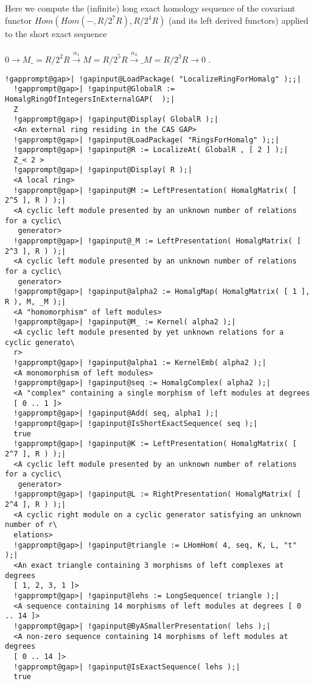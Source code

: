 \documentclass[a4paper,11pt]{report}
\begin{document}
{{ Here we compute the (infinite) long exact homology sequence of the covariant
functor $Hom(Hom(-,R/2^7R),R/2^4R)$ (and its left derived functors) applied to the short exact sequence\\
\\
 $0 \longrightarrow M\_=R/2^2R \stackrel{\alpha_1}{\longrightarrow} M=R/2^5R
\stackrel{\alpha_2}{\longrightarrow} \_M=R/2^3R \longrightarrow 0$ . 
\begin{Verbatim}[commandchars=!@|,fontsize=\small,frame=single,label=Example]
  !gapprompt@gap>| !gapinput@LoadPackage( "LocalizeRingForHomalg" );;|
  !gapprompt@gap>| !gapinput@GlobalR := HomalgRingOfIntegersInExternalGAP(  );|
  Z
  !gapprompt@gap>| !gapinput@Display( GlobalR );|
  <An external ring residing in the CAS GAP>
  !gapprompt@gap>| !gapinput@LoadPackage( "RingsForHomalg" );;|
  !gapprompt@gap>| !gapinput@R := LocalizeAt( GlobalR , [ 2 ] );|
  Z_< 2 >
  !gapprompt@gap>| !gapinput@Display( R );|
  <A local ring>
  !gapprompt@gap>| !gapinput@M := LeftPresentation( HomalgMatrix( [ 2^5 ], R ) );|
  <A cyclic left module presented by an unknown number of relations for a cyclic\
   generator>
  !gapprompt@gap>| !gapinput@_M := LeftPresentation( HomalgMatrix( [ 2^3 ], R ) );|
  <A cyclic left module presented by an unknown number of relations for a cyclic\
   generator>
  !gapprompt@gap>| !gapinput@alpha2 := HomalgMap( HomalgMatrix( [ 1 ], R ), M, _M );|
  <A "homomorphism" of left modules>
  !gapprompt@gap>| !gapinput@M_ := Kernel( alpha2 );|
  <A cyclic left module presented by yet unknown relations for a cyclic generato\
  r>
  !gapprompt@gap>| !gapinput@alpha1 := KernelEmb( alpha2 );|
  <A monomorphism of left modules>
  !gapprompt@gap>| !gapinput@seq := HomalgComplex( alpha2 );|
  <A "complex" containing a single morphism of left modules at degrees
  [ 0 .. 1 ]>
  !gapprompt@gap>| !gapinput@Add( seq, alpha1 );|
  !gapprompt@gap>| !gapinput@IsShortExactSequence( seq );|
  true
  !gapprompt@gap>| !gapinput@K := LeftPresentation( HomalgMatrix( [ 2^7 ], R ) );|
  <A cyclic left module presented by an unknown number of relations for a cyclic\
   generator>
  !gapprompt@gap>| !gapinput@L := RightPresentation( HomalgMatrix( [ 2^4 ], R ) );|
  <A cyclic right module on a cyclic generator satisfying an unknown number of r\
  elations>
  !gapprompt@gap>| !gapinput@triangle := LHomHom( 4, seq, K, L, "t" );|
  <An exact triangle containing 3 morphisms of left complexes at degrees
  [ 1, 2, 3, 1 ]>
  !gapprompt@gap>| !gapinput@lehs := LongSequence( triangle );|
  <A sequence containing 14 morphisms of left modules at degrees [ 0 .. 14 ]>
  !gapprompt@gap>| !gapinput@ByASmallerPresentation( lehs );|
  <A non-zero sequence containing 14 morphisms of left modules at degrees
  [ 0 .. 14 ]>
  !gapprompt@gap>| !gapinput@IsExactSequence( lehs );|
  true
\end{Verbatim}
 }

}
\end{document}

